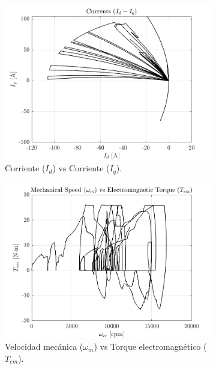 \begin{figure}[!htb]
\begin{subfigure}{0.4\textwidth}
        \includegraphics[width=\linewidth]{fig/id-iq_plot.png}
        \caption{Corriente ($I_{d}$) vs Corriente ($I_{q}$).}
    \end{subfigure}
    \begin{subfigure}{0.4\textwidth}
        \includegraphics[width=\linewidth]{fig/wm_Tem_plot.png}
        \caption{Velocidad mecánica ($\omega_{m}$) vs Torque electromagnético ($T_{em}$).}
    \end{subfigure}
    \begin{subfigure}{0.4\textwidth}

\end{subfigure}
\end{figure}
